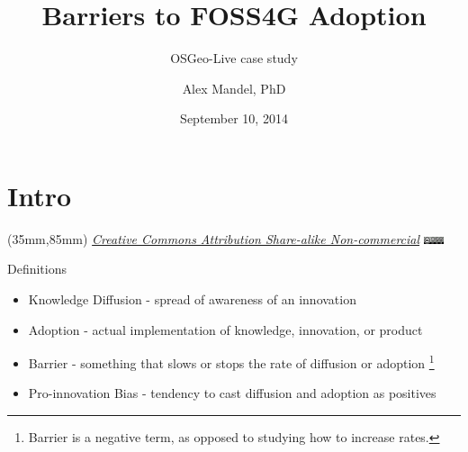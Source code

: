 \documentclass{beamer}
\title[PDFTitle]{Barriers to FOSS4G Adoption}
\subtitle[Sub]{OSGeo-Live case study}
\author[A. Mandel]{Alex Mandel, PhD} %
\institute[UCD]{
  Geography Graduate Group\\
  University of California, Davis\\
  \texttt{aimandel@ucdavis.edu}\\
  @aimandel
}
\date[Sep 2014]{September 10, 2014}
\newenvironment{reference}[2]{%
  \begin{textblock*}{\textwidth}(#1,#2) 
      \footnotesize\it\bgroup\color{black}}{\egroup\end{textblock*}}
\begin{document}
\section{Intro}
\begin{frame}[plain]
  \titlepage
   \begin{reference}{35mm}{85mm}
		\tiny \href{http://creativecommons.org/licenses/by-nc-sa/3.0/}{Creative Commons Attribution Share-alike Non-commercial}
		\includegraphics[width=22px]{cc-a-nc-sa-88x31.png}
   \end{reference} 
\end{frame}


\begin{frame}{Definitions}
	\begin{itemize}
		\item Knowledge Diffusion - spread of awareness of an innovation
		\item Adoption - actual implementation of knowledge, innovation, or product
		\item Barrier - something that slows or stops the rate of diffusion or adoption \footnote{Barrier is a negative term, as opposed to studying how to increase rates.}
		\item Pro-innovation Bias - tendency to cast diffusion and adoption as positives
	\end{itemize}

\end{frame}
\end{document}
